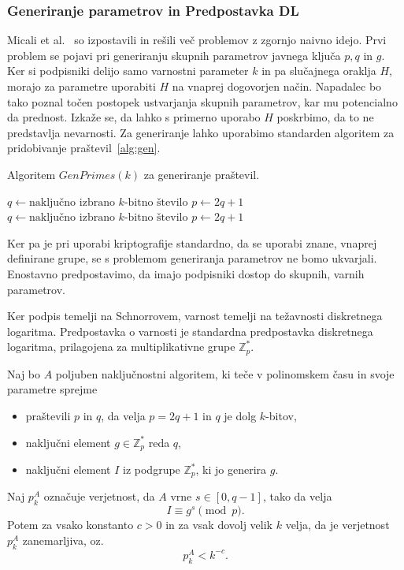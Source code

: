 \documentclass[isrm2, tisk]{fmfdelo}
\newcommand{\Z}{\mathbb Z}
\begin{document}
\subsubsection{Generiranje parametrov in Predpostavka DL}
Micali et al.~\cite{micali2001asm} so izpostavili in rešili več problemov z zgornjo naivno idejo.
Prvi problem se pojavi pri generiranju skupnih parametrov javnega ključa $p, q$ in $g$. Ker si podpisniki
delijo samo varnostni parameter $k$ in pa slučajnega oraklja $H$, morajo za parametre uporabiti
$H$ na vnaprej dogovorjen način. Napadalec bo tako poznal točen postopek ustvarjanja skupnih
parametrov, kar mu potencialno da prednost. Izkaže se, da lahko s primerno uporabo $H$ poskrbimo,
da to ne predstavlja nevarnosti. Za generiranje lahko uporabimo standarden algoritem za pridobivanje
praštevil~\ref{alg:gen}.
\begin{algorithm}
    \caption{Algoritem $GenPrimes(k)$ za generiranje praštevil.}
    \label{alg:gen}
    \begin{algorithmic}
        \State $q \gets \text{naključno izbrano $k$-bitno število}$
        \State $p \gets 2q + 1$
            \State $q \gets \text{naključno izbrano $k$-bitno število}$
            \State $p \gets 2q + 1$
        \EndWhile
        \State {}
    \end{algorithmic}
\end{algorithm}

Ker pa je pri uporabi kriptografije standardno, da se uporabi znane, vnaprej definirane grupe, se
s problemom generiranja parametrov ne bomo ukvarjali. Enostavno predpostavimo, da imajo podpisniki
dostop do skupnih, varnih parametrov.

Ker podpis temelji na Schnorrovem, varnost temelji na težavnosti diskretnega logaritma. Predpostavka
o varnosti je standardna predpostavka diskretnega logaritma, prilagojena za multiplikativne grupe
$\Z_p^*$.

\begin{definicija}
\label{def:asm_dlp}
    Naj bo $A$ poljuben naključnostni algoritem, ki teče v polinomskem času in svoje parametre sprejme 
    \begin{itemize}
        \item praštevili $p$ in $q$, da velja $p = 2q + 1$ in $q$ je dolg $k$-bitov,
        \item naključni element $g \in \Z_p^*$ reda $q$,
        \item naključni element $I$ iz podgrupe $\Z_p^*$, ki jo generira $g$.
    \end{itemize}
    Naj $p_k^A$ označuje verjetnost, da $A$ vrne $s \in [0, q - 1]$, tako da velja
    $$
    I \equiv g^s \pmod p.
    $$
    Potem za vsako konstanto $c > 0$ in za vsak dovolj velik $k$ velja, da je verjetnost $p_k^A$
    zanemarljiva, oz.\
    $$ 
    p_k^A < k^{-c}.
    $$
\end{definicija}
\end{document}
